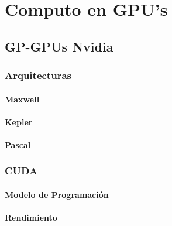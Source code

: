\chapter{Computo en GPU's}


\section{GP-GPUs Nvidia}
\subsection{Arquitecturas}
\subsubsection{Maxwell}
\subsubsection{Kepler}
\subsubsection{Pascal}
\subsection{CUDA}
\subsubsection{Modelo de Programación}
\subsubsection{Rendimiento}

